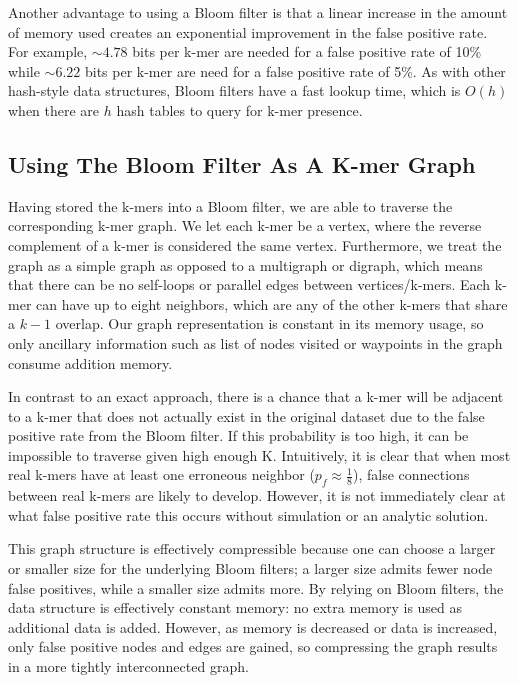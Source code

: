 \documentclass[12pt]{article} \usepackage{simplemargins}
\begin{document}
Another advantage to
using a Bloom filter is that a linear increase in the amount of memory
used creates an exponential improvement in the false positive
rate. For example, $\sim4.78$ bits per k-mer are needed for a false
positive rate of 10\% while $\sim6.22$ bits per k-mer are need for a false
positive rate of
5\%. As with other hash-style data structures, Bloom filters have a
fast lookup time, which is $O(h)$ when there are $h$ hash tables to query
for k-mer presence. 

\subsection{Using The Bloom Filter As A K-mer Graph}
Having stored the k-mers into a Bloom filter, we are able to traverse
the corresponding k-mer graph. We let each k-mer be a vertex, where
the reverse complement of a k-mer is considered the same
vertex. Furthermore, we treat the graph as a simple graph as opposed
to a multigraph or digraph, which means that there can be no
self-loops or parallel edges between vertices/k-mers. Each k-mer can
have up to eight neighbors, which are any of the other k-mers that
 share a $k-1$ 
overlap. Our graph representation is 
constant in its memory usage, so only ancillary information such as list of 
nodes visited or waypoints in the graph consume addition memory.
 
In contrast to an exact
approach, there is a chance that a k-mer will be adjacent to a k-mer
that does not actually exist in the original dataset due to the false
positive rate from the Bloom filter. If this probability is too high,
it can be impossible to traverse given high enough K.
Intuitively, it is clear that when most real k-mers 
have at least one erroneous neighbor ($p_f \approx \frac{1}{8}$), false connections 
between real k-mers are likely to develop. However, it is not immediately clear 
at what false positive rate this occurs without simulation or an analytic 
solution.

This graph structure is effectively compressible because one can choose a larger 
or smaller size for the underlying Bloom filters; a larger size admits fewer 
node false positives, while a smaller size admits more. By relying on Bloom 
filters, the data structure is effectively constant memory: no extra memory is 
used as additional data is added. However, as memory is decreased or data 
is increased, only false positive nodes and edges are gained, so 
compressing the graph results in a more tightly interconnected graph.
\end{document}
